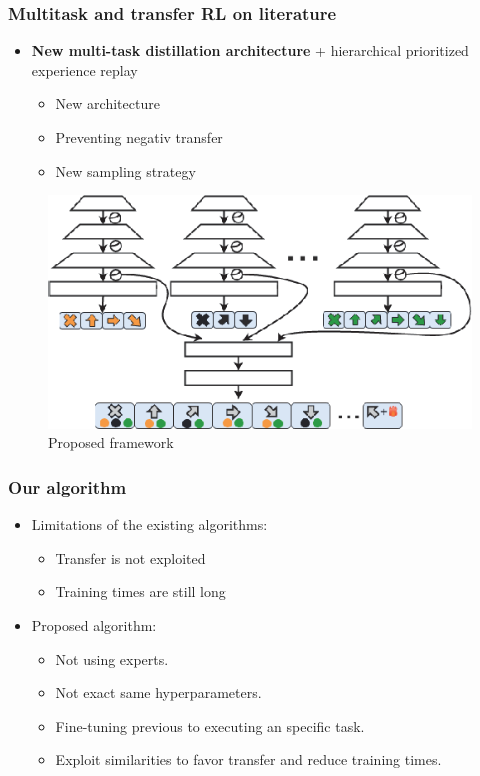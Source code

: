 \documentclass{beamer}
\theoremstyle{remark}
\theoremstyle{plain}
\begin{document}
\begin{frame}
  \frametitle{Multitask and transfer RL on literature}
\begin{itemize}
    \item \textbf{New multi-task distillation architecture} + hierarchical prioritized experience replay \cite{YinKnowledgeReplay}
    \begin{itemize}
        \item New architecture
        \item Preventing negativ transfer
        \item New sampling strategy
    \end{itemize} 
\end{itemize}
\begin{figure}
    \centering
    \includegraphics[scale=0.3]{figs/transfer.png}
    \caption{Proposed framework}
    \label{fig:my_label}
\end{figure}
 \end{frame}
\begin{frame}
\frametitle{Our algorithm}
\begin{itemize}
    \item Limitations of the existing algorithms:
    \begin{itemize}
        \item Transfer is not exploited
        \item Training times are still long
    \end{itemize}
\item Proposed algorithm:
        \begin{itemize}
            \item Not using experts.
            \item Not exact same hyperparameters.
            \item Fine-tuning previous to executing an specific task.
            \item Exploit similarities to favor transfer and reduce training times.
        \end{itemize}
\end{itemize}
    
\end{frame}
\end{document}
